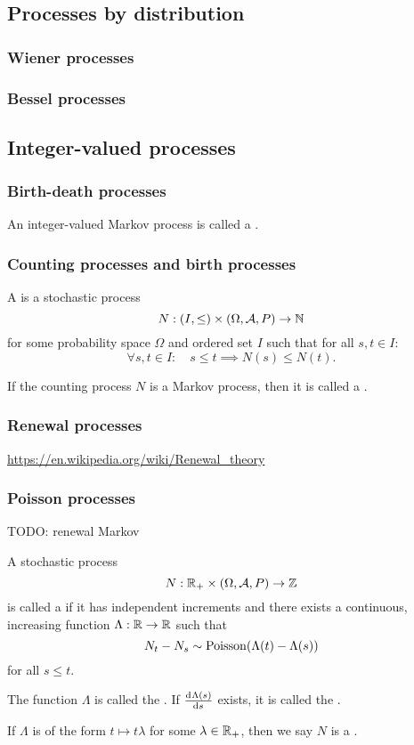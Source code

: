 \subsection{Processes by distribution}
\subsubsection{Wiener processes}
\subsubsection{Bessel processes}

\subsection{Integer-valued processes}
\subsubsection{Birth-death processes}
\begin{definition}
An integer-valued Markov process is called a .
\end{definition}

\subsubsection{Counting processes and birth processes}
\begin{definition}
A  is a stochastic process
\[ N: \left( I,\leq \right)\times \left( \Omega, \mathcal{A}, P \right) \to \mathbb{N} \]
for some probability space $\Omega$ and ordered set $I$ such that for all $s,t\in I$:
\[ \forall s,t\in I: \quad s\leq t \implies N(s)\leq N(t). \]

If the counting process $N$ is a Markov process, then it is called a .
\end{definition}

\subsubsection{Renewal processes}
\url{https://en.wikipedia.org/wiki/Renewal_theory}

\subsubsection{Poisson processes}
TODO: renewal Markov
\begin{definition}
A stochastic process
\[ N: \mathbb{R}_+\times \left( \Omega, \mathcal{A}, P \right) \to \mathbb{Z} \]
is called a  if it has independent increments and there exists a continuous, increasing function $\Lambda: \mathbb{R}\to \mathbb{R}$ such that
\[ N_t - N_s \sim \operatorname{Poisson}(\Lambda(t) - \Lambda(s)) \]
for all $s\leq t$.

The function $\Lambda$ is called the . If $\od{\Lambda(s)}{s}$ exists, it is called the .

If $\Lambda$ is of the form $t\mapsto t\lambda$ for some $\lambda \in \mathbb{R}_+$, then we say $N$ is a .
\end{definition}


